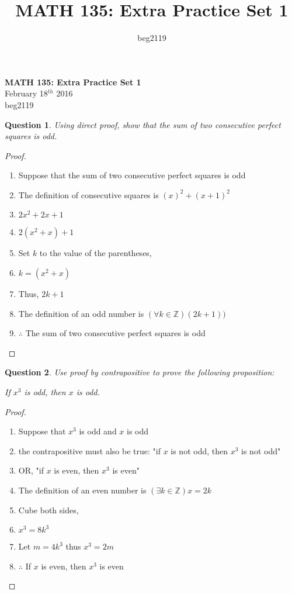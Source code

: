 \documentclass[11pt,oneside]{article}
\title{MATH 135: Extra Practice Set 1}
\author{beg2119}
\newtheorem{question}{Question}
\begin{document}
\begin{center}
    \textbf{MATH 135: Extra Practice Set 1} \\
    February 18$^{th}$ 2016 \\

    beg2119
\end{center}

\bigskip

\begin{question}
    Using direct proof, show that the sum of two consecutive perfect squares is odd.
\end{question}

\begin{proof}
    \begin{enumerate}
        \item Suppose that the sum of two consecutive perfect squares is odd
        \item The definition of consecutive squares is $(x)^2 + (x+1)^2$
        \item $2x^2 + 2x + 1$
        \item $2(x^2 + x) + 1$
        \item Set $k$ to the value of the parentheses,
        \item $k=(x^2 + x)$
        \item Thus, $2k + 1$
        \item The definition of an odd number is $(\forall k \in \mathbb{Z})(2k + 1))$
        \item $\therefore$ The sum of two consecutive perfect squares is odd
    \end{enumerate}
\end{proof}

\bigskip

\begin{question}
    Use proof by contrapositive to prove the following proposition:\\
    \centerline{If $x^3$ is odd, then $x$ is odd.}
\end{question}

\begin{proof}
    \begin{enumerate}
        \item Suppose that $x^3$ is odd and $x$ is odd
        \item the contrapositive must also be true: "if $x$ is not odd, then $x^3$ is not odd"
        \item OR, "if $x$ is even, then $x^3$ is even"
        \item The definition of an even number is $(\exists k \in \mathbb{Z}) x = 2k$
        \item Cube both sides,
        \item $x^3 = 8k^3$
        \item Let $m = 4k^3$ thus $ x^3 = 2m$
        \item $\therefore$ If $x$ is even, then $x^3$ is even
    \end{enumerate}
\end{proof}
\end{document}
